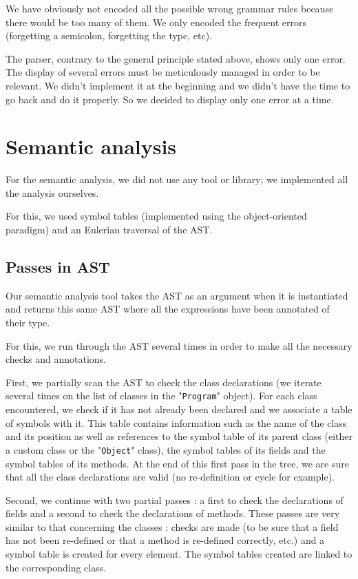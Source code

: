 \documentclass[a4paper, 12pt]{article}
\begin{document}
    We have obviously not encoded all the possible wrong grammar rules because there would be too many of them. We only encoded the frequent errors (forgetting a semicolon, forgetting the type, etc).
    
    The parser, contrary to the general principle stated above, shows only one error. The display of several errors must be meticulously managed in order to be relevant. We didn't implement it at the beginning and we didn't have the time to go back and do it properly. So we decided to display only one error at a time.
    
    
    \section{Semantic analysis}
    
    For the semantic analysis, we did not use any tool or library; we implemented all the analysis ourselves.
    
    For this, we used symbol tables (implemented using the object-oriented paradigm) and an Eulerian traversal of the AST.
    
    \subsection{Passes in AST}
    
    Our semantic analysis tool takes the AST as an argument when it is instantiated and returns this same AST where all the expressions have been annotated of their type.
    
    For this, we run through the AST several times in order to make all the necessary checks and annotations.
    
    First, we partially scan the AST to check the class declarations (we iterate several times on the list of classes in the "\texttt{Program}" object). For each class encountered, we check if it has not already been declared and we associate a table of symbols with it. This table contains information such as the name of the class and its position as well as references to the symbol table of its parent class (either a custom class or the "\texttt{Object}" class), the symbol tables of its fields and the symbol tables of its methods. At the end of this first pass in the tree, we are sure that all the class declarations are valid (no re-definition or cycle for example).
    
    Second, we continue with two partial passes : a first to check the declarations of fields and a second to check the declarations of methods. These passes are very similar to that concerning the classes : checks are made (to be sure that a field has not been re-defined or that a method is re-defined correctly, etc.) and a symbol table is created for every element. The symbol tables created are linked to the corresponding class.
    
\end{document}
